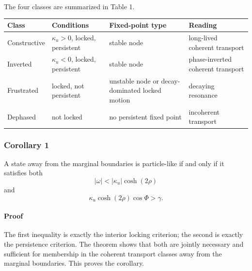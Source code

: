 \documentclass[
]{article}
\newcounter{none} %
\begin{document}
The four classes are summarized in Table 1.

{\def\LTcaptype{none} %
\begin{longtable}[]{@{}
  >{\raggedright\arraybackslash}p{}
  >{\raggedright\arraybackslash}p{}
  >{\raggedright\arraybackslash}p{}
  >{\raggedright\arraybackslash}p{}@{}}
\toprule\noalign{}
\begin{minipage}[b]{\linewidth}\raggedright
Class
\end{minipage} & \begin{minipage}[b]{\linewidth}\raggedright
Conditions
\end{minipage} & \begin{minipage}[b]{\linewidth}\raggedright
Fixed-point type
\end{minipage} & \begin{minipage}[b]{\linewidth}\raggedright
Reading
\end{minipage} \\
\midrule\noalign{}
\endhead
\bottomrule\noalign{}
\endlastfoot
Constructive & \(\kappa_{u}>0\), locked, persistent & stable node &
long-lived coherent transport \\
Inverted & \(\kappa_{u}<0\), locked, persistent & stable node &
phase-inverted coherent transport \\
Frustrated & locked, not persistent & unstable node or decay-dominated
locked motion & decaying resonance \\
Dephased & not locked & no persistent fixed point & incoherent
transport \\
\end{longtable}
}

\subsubsection{Corollary 1}\label{corollary-1}

A state away from the marginal boundaries is particle-like if and only
if it satisfies both \[
|\omega| < |\kappa_{u}|\cosh(2\rho)
\] and \[
\kappa_{u}\cosh(2\rho)\cos\Phi > \gamma.
\]

\paragraph{Proof}\label{proof-5}

The first inequality is exactly the interior locking criterion; the
second is exactly the persistence criterion. The theorem shows that both
are jointly necessary and sufficient for membership in the coherent
transport classes away from the marginal boundaries. This proves the
corollary.
\end{document}
